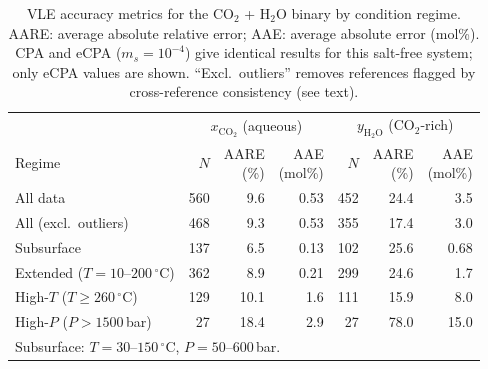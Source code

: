 \documentclass[preprint,12pt,number]{elsarticle}
\begin{document}
\begin{table}[H]
  \centering
  \caption{VLE accuracy metrics for the CO$_2$ + H$_2$O binary by condition regime.
           AARE: average absolute relative error; AAE: average absolute error (mol\%).
           CPA and eCPA ($m_s = 10^{-4}$) give identical results for this salt-free system;
           only eCPA values are shown.
           ``Excl.\ outliers'' removes references flagged by cross-reference consistency
           (see text).}
  \label{tab:co2h2o_metrics}
  \begin{tabular}{lrrrrrr}
    \toprule
    & \multicolumn{3}{c}{$x_{\text{CO}_2}$ (aqueous)} & \multicolumn{3}{c}{$y_{\text{H}_2\text{O}}$ (CO$_2$-rich)} \\
    \cmidrule(lr){2-4} \cmidrule(lr){5-7}
    Regime & $N$ & \shortstack{AARE\\(\%)} & \shortstack{AAE\\(mol\%)} & $N$ & \shortstack{AARE\\(\%)} & \shortstack{AAE\\(mol\%)} \\
    \midrule
    All data                          & 560 & 9.6  & 0.53 & 452 & 24.4 & 3.5  \\
    All (excl.\ outliers)             & 468 & 9.3  & 0.53 & 355 & 17.4 & 3.0  \\
    Subsurface                        & 137 & 6.5  & 0.13 & 102 & 25.6 & 0.68 \\
    Extended ($T = 10$--$200\,^\circ$C)    & 362 & 8.9  & 0.21 & 299 & 24.6 & 1.7  \\
    High-$T$ ($T \geq 260\,^\circ$C)       & 129 & 10.1 & 1.6  & 111 & 15.9 & 8.0  \\
    High-$P$ ($P > 1500$\,bar)        & 27  & 18.4 & 2.9  & 27  & 78.0 & 15.0 \\
    \bottomrule
    \multicolumn{7}{l}{\footnotesize Subsurface: $T = 30$--$150\,^\circ$C, $P = 50$--$600$\,bar.} \\
  \end{tabular}
\end{table}
\end{document}
